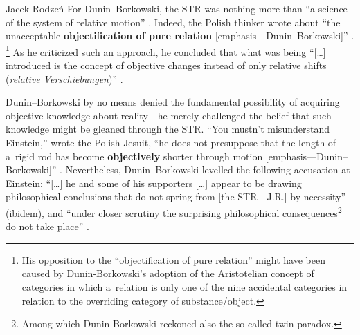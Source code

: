 \begin{artengenv}{Jacek Rodzeń}
For Dunin–Borkowski, the STR was nothing more than ``a science of the system of relative motion''
\parencite*[][p.213]{dunin-borkowski_neue_1921}. %
 Indeed, the Polish thinker wrote about ``the unacceptable \textbf{objectification of pure relation} [emphasis---Dunin–Borkowski]'' 
\parencite*[][pp.214–215]{dunin-borkowski_neue_1921}.%
\footnote{His opposition to the ``objectification of pure relation'' might have been caused by Dunin-Borkowski's adoption of the Aristotelian concept of categories in which a~relation is only one of the nine accidental categories in relation to the overriding category of substance/object.} As he criticized such an approach, he concluded that what was being ``[…] introduced is the concept of objective changes instead of only relative shifts (\textit{relative Verschiebungen})'' 
\parencite*[][p.214]{dunin-borkowski_neue_1921}.%


Dunin–Borkowski by no means denied the fundamental possibility of acquiring objective knowledge about reality---he merely challenged the belief that such knowledge might be gleaned through the STR. ``You mustn't misunderstand Einstein,'' wrote the Polish Jesuit, ``he does not presuppose that the length of a~rigid rod has become \textbf{objectively} shorter through motion [emphasis---Dunin–Borkowski]''
\parencite*[][p.212]{dunin-borkowski_neue_1921}. %
 Nevertheless, Dunin–Borkowski levelled the following accusation at Einstein: ``[\ldots] he and some of his supporters […] appear to be drawing philosophical conclusions that do not spring from [the STR---J.R.] by necessity'' (ibidem), and ``under closer scrutiny the surprising philosophical consequences\footnote{Among which Dunin-Borkowski reckoned also the so-called twin paradox.} do not take place'' 
\parencite*[][p.215]{dunin-borkowski_neue_1921}.%



\end{artengenv}
